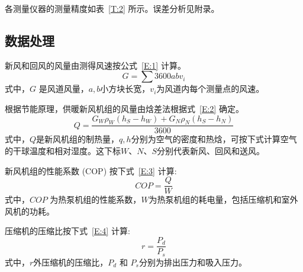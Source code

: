 各测量仪器的测量精度如表~\ref{T:2} 所示。误差分析见附录。

\subsection{数据处理}
新风和回风的风量由测得风速按公式~\ref{E:1} 计算。
\begin{equation}\label{E:1}
	G = \sum 3600 abv_i
\end{equation}
式中，$G$ 是风道风量，$a, b$小方块长宽，$v_i$为风道内每个测量点的风速。

根据节能原理，供暖新风机组的风量由焓差法根据式~\ref{E:2} 确定。
\begin{equation}\label{E:2}
	Q = \frac{G_W \rho_W (h_S - h_W) + G_N \rho_N (h_S - h_N)}{3600} 
\end{equation}
式中，$Q$是新风机组的制热量，$q, h$分别为空气的密度和热焓，可按下式计算空气的干球温度和相对湿度。这下标$W、N、S$分别代表新风、回风和送风。

新风机组的性能系数 (COP) 按下式~\ref{E:3} 计算:
\begin{equation}\label{E:3}
	COP = \frac{Q}{W} 
\end{equation}
式中，$COP$ 为热泵机组的性能系数，$W$为热泵机组的耗电量，包括压缩机和室外风机的功耗。

压缩机的压缩比按下式~\ref{E:4} 计算:
\begin{equation}\label{E:4}
	r = \frac{P_d}{P_s} 
\end{equation}
式中，$r$外压缩机的压缩比，$P_d$ 和 $P_s$分别为排出压力和吸入压力。

